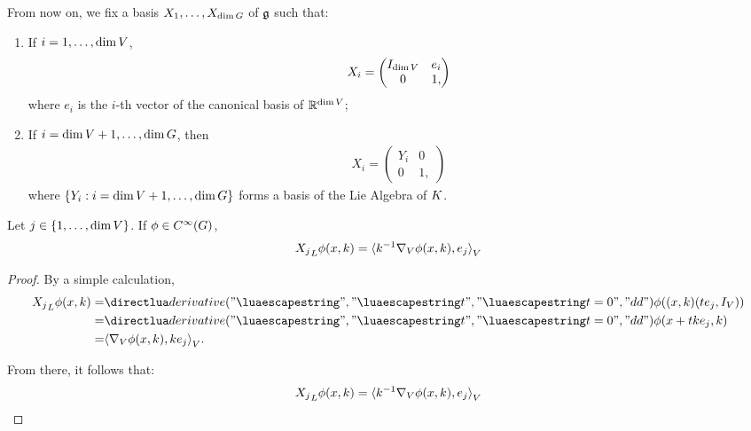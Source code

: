 From now on, we fix a basis $X_1, \dots, X_{\dim G}$ of $\mathfrak{g}$ such that:
\begin{enumerate}
    \item If $i = 1, \dots, \dim V$,
        \begin{align*}
            X_i =
                \begin{pmatrix}
                    {I_{\dim V}} & e_i\\
                    0 & 1,
                \end{pmatrix}
        \end{align*}
        where $e_i$ is the $i$-th vector of the canonical basis of $\mathbb{R}^{\dim V}$;
    \item If $i = \dim V + 1, \dots, \dim G$, then
        \begin{align}
            X_i =
                \begin{pmatrix}
                    Y_i & 0\\
                    0 & 1,
                \end{pmatrix}
                \label{eq:Lie_algebra_vector_coming_from_compact_group}
        \end{align}
        where $\{Y_i : i = \dim V + 1, \dots, \dim G\}$ forms a basis of the Lie Algebra of $K$.
\end{enumerate}

\begin{lemma}
    Let $j \in \{1, \dots, \dim V\}$.
    If $\phi \in {C^\infty(G)}$,
    \begin{align*}
        {X_j}_L \phi(x, k)
        = {{\langle k^{-1} \nabla_{V} \phi(x, k), e_j \rangle}_{V}}
    \end{align*}
\end{lemma}
\begin{proof}
    By a simple calculation,
    \begin{align*}
        \LeftDifferentialOperatorFirstOrder{X_j} \phi(x, k)
        =& \D*{t}<t = 0> \phi((x, k) (t e_j, \Id\VectorSpace))\\
        =& \D*{t}<t = 0> \phi(x + t k e_j, k)\\
        =& \ip{\grad \phi(x, k)}{k e_j}.
    \end{align*}

    From there, it follows that:
    \begin{align*}
        {X_j}_L \phi(x, k)
        = {{\langle k^{-1} \nabla_{V} \phi(x, k), e_j \rangle}_{V}}
    \end{align*}
\end{proof}

